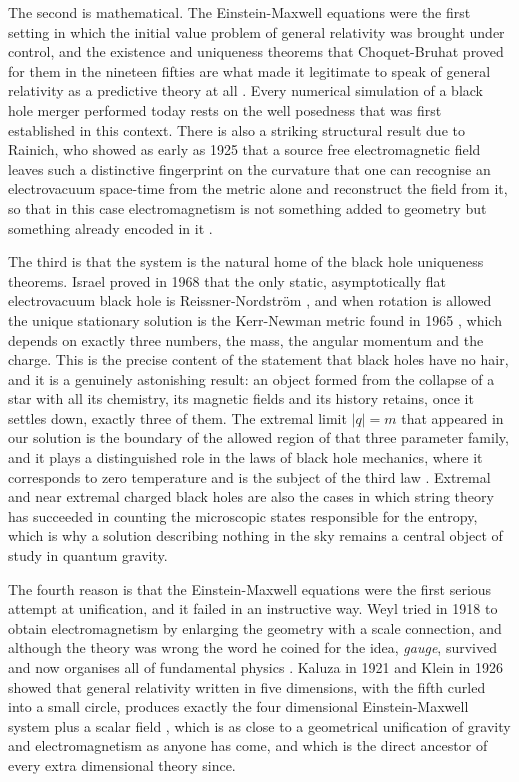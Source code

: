         The second is mathematical. The Einstein-Maxwell equations were the first setting in which the initial value problem of general relativity was brought under control, and the existence and uniqueness theorems that Choquet-Bruhat proved for them in the nineteen fifties are what made it legitimate to speak of general relativity as a predictive theory at all \citep{fouresbruhat1952}. Every numerical simulation of a black hole merger performed today rests on the well posedness that was first established in this context. There is also a striking structural result due to Rainich, who showed as early as 1925 that a source free electromagnetic field leaves such a distinctive fingerprint on the curvature that one can recognise an electrovacuum space-time from the metric alone and reconstruct the field from it, so that in this case electromagnetism is not something added to geometry but something already encoded in it \citep{rainich1925}.

        The third is that the system is the natural home of the black hole uniqueness theorems. Israel proved in 1968 that the only static, asymptotically flat electrovacuum black hole is Reissner-Nordström \citep{israel1968}, and when rotation is allowed the unique stationary solution is the Kerr-Newman metric found in 1965 \citep{newman1965}, which depends on exactly three numbers, the mass, the angular momentum and the charge. This is the precise content of the statement that black holes have no hair, and it is a genuinely astonishing result: an object formed from the collapse of a star with all its chemistry, its magnetic fields and its history retains, once it settles down, exactly three of them. The extremal limit $|q|=m$ that appeared in our solution is the boundary of the allowed region of that three parameter family, and it plays a distinguished role in the laws of black hole mechanics, where it corresponds to zero temperature and is the subject of the third law \citep{bardeen1973}. Extremal and near extremal charged black holes are also the cases in which string theory has succeeded in counting the microscopic states responsible for the entropy, which is why a solution describing nothing in the sky remains a central object of study in quantum gravity.

        The fourth reason is that the Einstein-Maxwell equations were the first serious attempt at unification, and it failed in an instructive way. Weyl tried in 1918 to obtain electromagnetism by enlarging the geometry with a scale connection, and although the theory was wrong the word he coined for the idea, \textit{gauge}, survived and now organises all of fundamental physics \citep{weyl1918}. Kaluza in 1921 and Klein in 1926 showed that general relativity written in five dimensions, with the fifth curled into a small circle, produces exactly the four dimensional Einstein-Maxwell system plus a scalar field \citep{kaluza1921,klein1926}, which is as close to a geometrical unification of gravity and electromagnetism as anyone has come, and which is the direct ancestor of every extra dimensional theory since.

